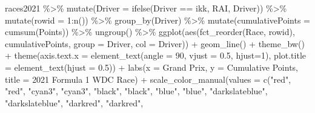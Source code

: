 \documentclass[
]{book}
\newenvironment{Shaded}{\begin{snugshade}}{\end{snugshade}}
\newcommand{\AttributeTok}[1]{\textcolor[rgb]{0.77,0.63,0.00}{#1}}
\newcommand{\DecValTok}[1]{\textcolor[rgb]{0.00,0.00,0.81}{#1}}
\newcommand{\FloatTok}[1]{\textcolor[rgb]{0.00,0.00,0.81}{#1}}
\newcommand{\FunctionTok}[1]{\textcolor[rgb]{0.00,0.00,0.00}{#1}}
\newcommand{\NormalTok}[1]{#1}
\newcommand{\SpecialCharTok}[1]{\textcolor[rgb]{0.00,0.00,0.00}{#1}}
\newcommand{\StringTok}[1]{\textcolor[rgb]{0.31,0.60,0.02}{#1}}
\begin{document}
\begin{Shaded}
\begin{Highlighting}[]
\NormalTok{races2021 }\SpecialCharTok{\%\textgreater{}\%}
  \FunctionTok{mutate}\NormalTok{(}\AttributeTok{Driver =} \FunctionTok{ifelse}\NormalTok{(Driver }\SpecialCharTok{==} \StringTok{\textquotesingle{}ikk\textquotesingle{}}\NormalTok{, }\StringTok{\textquotesingle{}RAI\textquotesingle{}}\NormalTok{, Driver)) }\SpecialCharTok{\%\textgreater{}\%} 
  \FunctionTok{mutate}\NormalTok{(}\AttributeTok{rowid =} \DecValTok{1}\SpecialCharTok{:}\FunctionTok{n}\NormalTok{()) }\SpecialCharTok{\%\textgreater{}\%}
  \FunctionTok{group\_by}\NormalTok{(Driver) }\SpecialCharTok{\%\textgreater{}\%} 
  \FunctionTok{mutate}\NormalTok{(}\AttributeTok{cumulativePoints =} \FunctionTok{cumsum}\NormalTok{(Points)) }\SpecialCharTok{\%\textgreater{}\%}
  \FunctionTok{ungroup}\NormalTok{() }\SpecialCharTok{\%\textgreater{}\%} 
  \FunctionTok{ggplot}\NormalTok{(}\FunctionTok{aes}\NormalTok{(}\FunctionTok{fct\_reorder}\NormalTok{(Race, rowid), cumulativePoints,}
         \AttributeTok{group =}\NormalTok{ Driver, }\AttributeTok{col =}\NormalTok{ Driver)) }\SpecialCharTok{+}
  \FunctionTok{geom\_line}\NormalTok{() }\SpecialCharTok{+}
  \FunctionTok{theme\_bw}\NormalTok{() }\SpecialCharTok{+} 
  \FunctionTok{theme}\NormalTok{(}\AttributeTok{axis.text.x =} \FunctionTok{element\_text}\NormalTok{(}\AttributeTok{angle =} \DecValTok{90}\NormalTok{, }\AttributeTok{vjust =} \FloatTok{0.5}\NormalTok{, }\AttributeTok{hjust=}\DecValTok{1}\NormalTok{),}
        \AttributeTok{plot.title =} \FunctionTok{element\_text}\NormalTok{(}\AttributeTok{hjust =} \FloatTok{0.5}\NormalTok{)) }\SpecialCharTok{+}
  \FunctionTok{labs}\NormalTok{(}\AttributeTok{x =} \StringTok{\textquotesingle{}Grand Prix\textquotesingle{}}\NormalTok{,}
       \AttributeTok{y =} \StringTok{\textquotesingle{}Cumulative Points\textquotesingle{}}\NormalTok{,}
       \AttributeTok{title =} \StringTok{\textquotesingle{}2021 Formula 1 WDC Race\textquotesingle{}}\NormalTok{) }\SpecialCharTok{+}
  \FunctionTok{scale\_color\_manual}\NormalTok{(}\AttributeTok{values =} \FunctionTok{c}\NormalTok{(}\StringTok{"red"}\NormalTok{, }\StringTok{"red"}\NormalTok{, }
                                \StringTok{"cyan3"}\NormalTok{, }\StringTok{"cyan3"}\NormalTok{, }
                                \StringTok{"black"}\NormalTok{, }\StringTok{"black"}\NormalTok{,}
                                \StringTok{"blue"}\NormalTok{, }\StringTok{"blue"}\NormalTok{,}
                                \StringTok{"darkslateblue"}\NormalTok{, }\StringTok{"darkslateblue"}\NormalTok{,}
                                \StringTok{"darkred"}\NormalTok{, }\StringTok{"darkred"}\NormalTok{, }

\end{Highlighting}
\end{Shaded}
\end{document}
